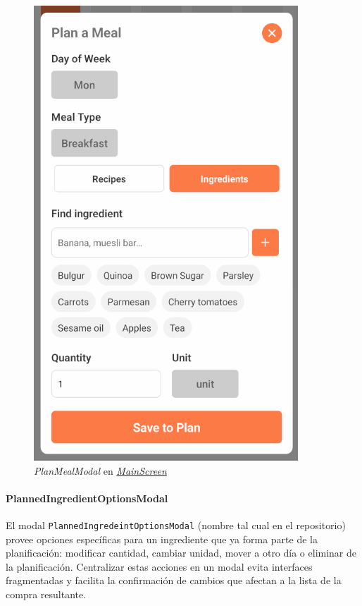 \documentclass[twoside, openright, 11pt]{report}
\begin{document}
					\begin{figure}[H]
						\centering
						\includegraphics[scale=0.5]{imagenes/PlanMealModal.png}
						\caption{\textit{PlanMealModal} en \hyperref[fig:MainScreen]{\textit{MainScreen}}}
						\label{fig:PlanMealModal}
					\end{figure}

				\paragraph{PlannedIngredientOptionsModal}
					El modal \texttt{PlannedIngredeintOptionsModal} (nombre tal cual en el repositorio) provee opciones específicas para un ingrediente que ya forma parte de la planificación: modificar cantidad, cambiar unidad, mover a otro día o eliminar de la planificación. Centralizar estas acciones en un modal evita interfaces fragmentadas y facilita la confirmación de cambios que afectan a la lista de la compra resultante.
						
\end{document}
